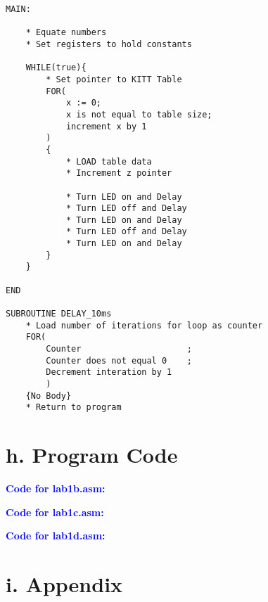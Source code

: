 \documentclass[11pt]{article}
\theoremstyle{plain}
\theoremstyle{definition}
\begin{document}
\begin{tcolorbox}
\begin{verbatim}
MAIN:

    * Equate numbers
    * Set registers to hold constants
    
    WHILE(true){
        * Set pointer to KITT Table
        FOR(
            x := 0;
            x is not equal to table size;
            increment x by 1
        )
        {
            * LOAD table data
            * Increment z pointer
            
            * Turn LED on and Delay
            * Turn LED off and Delay
            * Turn LED on and Delay
            * Turn LED off and Delay
            * Turn LED on and Delay
        }
    }

END

SUBROUTINE DELAY_10ms
    * Load number of iterations for loop as counter
    FOR( 
        Counter					    ;
        Counter does not equal 0	;
        Decrement interation by 1	
        )
    {No Body}
    * Return to program	
\end{verbatim}
\end{tcolorbox}
\newpage
\section*{h. Program Code}
\textbf{\textcolor{blue}{Code for lab1b.asm:}}

\textbf{\textcolor{blue}{Code for lab1c.asm:}}

\textbf{\textcolor{blue}{Code for lab1d.asm:}}

\section*{i. Appendix}
\end{document}
